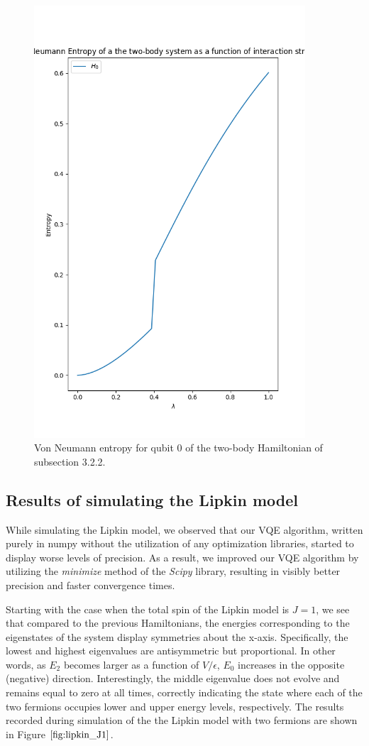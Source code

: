 \documentclass[onecolumn,10pt,cleanfoot]{asme2ej}
\begin{document}
\begin{figure}[H]
  \centering
  \includegraphics[width=0.9\textwidth, height=0.75\textwidth]{figures/Von_Neumann_entropy_2qubit.png}
  \caption{Von Neumann entropy for qubit 0 of the two-body Hamiltonian of subsection 3.2.2.}
  \label{fig:entropy}
\end{figure}

\subsection{Results of simulating the Lipkin model}
While simulating the Lipkin model, we observed that our VQE algorithm, written purely in numpy without the utilization of any optimization libraries, started to display worse levels of precision. As a result, we improved our VQE algorithm by utilizing the \textit{minimize} method of the \textit{Scipy} library, resulting in visibly better precision and faster convergence times.

Starting with the case when the total spin of the Lipkin model is $J=1$, we see that compared to the previous Hamiltonians, the energies corresponding to the eigenstates of the system display symmetries about the x-axis. Specifically, the lowest and highest eigenvalues are antisymmetric but proportional. In other words, as $E_2$ becomes larger as a function of $V/\epsilon$, $E_0$ increases in the opposite (negative) direction. Interestingly, the middle eigenvalue does not evolve and remains equal to zero at all times, correctly indicating the state where each of the two fermions occupies lower and upper energy levels, respectively. The results recorded during simulation of the the Lipkin model with two fermions are shown in Figure $\ref{fig:lipkin_J1}$.
\end{document}
